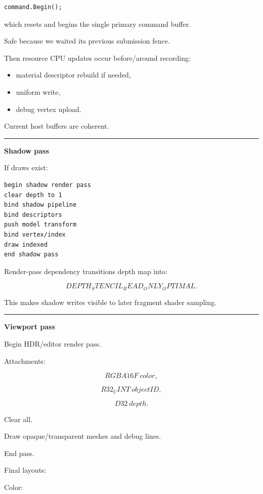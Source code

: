 \begin{verbatim}
command.Begin();
\end{verbatim}

which resets and begins the single primary command buffer.

Safe because we waited its previous submission fence.

Then resource CPU updates occur before/around recording:

\begin{itemize}
\tightlist
\item
  material descriptor rebuild if needed,
\item
  uniform write,
\item
  debug vertex upload.
\end{itemize}

Current host buffers are coherent.

\begin{center}\rule{0.5\linewidth}{0.5pt}\end{center}

\textbf{Shadow pass}

If draws exist:

\begin{verbatim}
begin shadow render pass
clear depth to 1
bind shadow pipeline
bind descriptors
push model transform
bind vertex/index
draw indexed
end shadow pass
\end{verbatim}

Render-pass dependency transitions depth map into:

\[
DEPTH_STENCIL_READ_ONLY_OPTIMAL.
\]

This makes shadow writes visible to later fragment shader sampling.

\begin{center}\rule{0.5\linewidth}{0.5pt}\end{center}

\textbf{Viewport pass}

Begin HDR/editor render pass.

Attachments:

\[
RGBA16F\ color,
\]

\[
R32_UINT\ objectID,
\]

\[
D32\ depth.
\]

Clear all.

Draw opaque/transparent meshes and debug lines.

End pass.

Final layouts:

Color:


